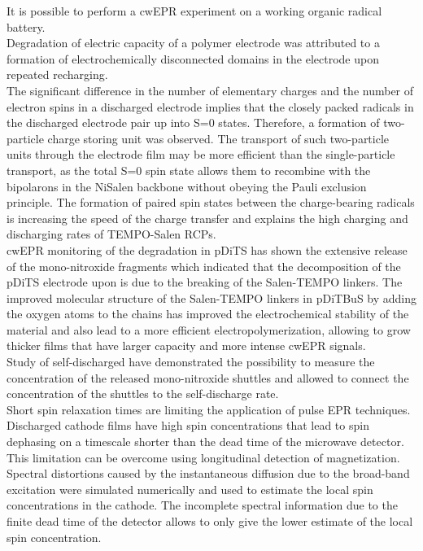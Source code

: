 It is possible to perform a cwEPR experiment on a working organic radical battery.\\
Degradation of electric capacity of a polymer electrode was attributed to a formation of electrochemically disconnected domains in the electrode upon repeated recharging.\\

The significant difference in the number of elementary charges and the number of electron spins in a discharged electrode implies that the closely packed radicals in the discharged electrode pair up into S=0 states. Therefore, a formation of two-particle charge storing unit was observed. The transport of such two-particle units through the electrode film may be more efficient than the single-particle transport, as the total S=0 spin state allows them to recombine with the bipolarons in the NiSalen backbone without obeying the Pauli exclusion principle. The formation of paired spin states between the charge-bearing radicals is increasing the speed of the charge transfer and explains the high charging and discharging rates of TEMPO-Salen RCPs.\\

cwEPR monitoring of the degradation in pDiTS has shown the extensive release of the mono-nitroxide fragments which indicated that the decomposition of the pDiTS electrode upon is due to the breaking of the Salen-TEMPO linkers. The improved molecular structure of the Salen-TEMPO linkers in pDiTBuS by adding the oxygen atoms to the chains has improved the electrochemical stability of the material and also lead to a more efficient electropolymerization, allowing to grow thicker films that have larger capacity and more intense cwEPR signals.\\

Study of self-discharged have demonstrated the possibility to measure the concentration of the released mono-nitroxide shuttles and allowed to connect the concentration of the shuttles to the self-discharge rate.\\

Short spin relaxation times are limiting the application of pulse EPR techniques. Discharged cathode films have high spin concentrations that lead to spin dephasing on a timescale shorter than the dead time of the microwave detector. This limitation can be overcome using longitudinal detection of magnetization.\\

Spectral distortions caused by the instantaneous diffusion due to the broad-band excitation were simulated numerically and used to estimate the local spin concentrations in the cathode. The incomplete spectral information due to the finite dead time of the detector allows to only give the lower estimate of the local spin concentration.\\


